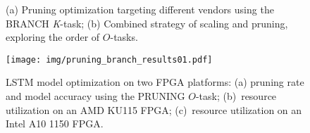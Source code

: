 

\begin{figure} [bp]
   \centering
   \hspace*{\fill}
   \hspace*{\fill}
 \hspace*{\fill}
  \caption{(a) Pruning optimization targeting different vendors using the BRANCH \textit{K}-task; (b) Combined strategy of scaling and pruning, exploring the order of $O$-tasks. }
  \label{fig:branch_parallel_design_flows} 
\end{figure}


\begin{figure}
\begin{center}
\texttt{[image: img/pruning\_branch\_results01.pdf]}
\end{center}
\caption{LSTM model optimization on two FPGA platforms: (a) pruning rate and model accuracy using the PRUNING $O$-task; (b)~resource utilization on an AMD KU115 FPGA; (c)~resource utilization on an Intel A10 1150 FPGA.}

 
\label{fig:design_flow_branch_results}

\end{figure}


